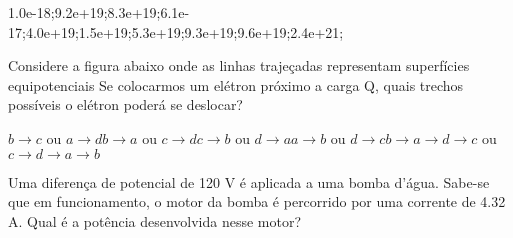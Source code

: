 \documentclass[12pt, addpoints]{exam}
\begin{document}
\begin{questions}
\begin{multicols*}{2}
\begin{oneparchoices}
\choice 1.0e-18;\choice 9.2e+19;\choice 8.3e+19;\choice 6.1e-17;\choice 4.0e+19;\choice 1.5e+19;\choice 5.3e+19;\choice 9.3e+19;\choice 9.6e+19;\choice 2.4e+21;\end{oneparchoices}
\question[20] Considere a figura abaixo onde as linhas trajeçadas representam superfícies equipotenciais Se colocarmos um elétron próximo a carga Q, quais trechos possíveis o elétron poderá se deslocar?
        
        \begin{center}
            \begin{minipage}[c]{0.5\linewidth}
            \end{minipage}
        \end{center}
        
        

\begin{choices}
\choice $b\rightarrow c$ ou $a\rightarrow d$\choice $b\rightarrow a$ ou $c\rightarrow d$\choice $c\rightarrow b$ ou $d\rightarrow a$\choice $a\rightarrow b$ ou $d\rightarrow c$\choice $b\rightarrow a\rightarrow d\rightarrow c$ ou $c\rightarrow d\rightarrow a\rightarrow b$\end{choices}
\question[20] Uma diferença de potencial de 120 V é aplicada a uma bomba d’água. Sabe-se que em funcionamento, o motor da bomba é percorrido por uma corrente de    4.32 A. Qual é a potência desenvolvida nesse motor?


\end{multicols*}
\end{questions}
\end{document}
